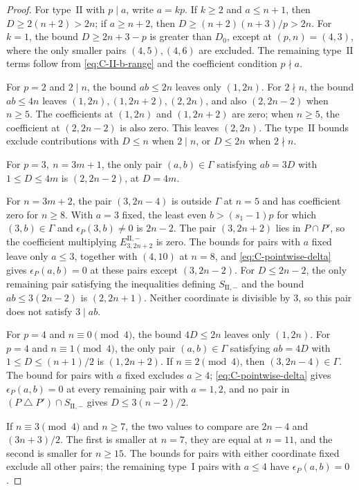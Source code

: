 \documentclass[11pt,a4paper]{amsart}
\theoremstyle{plain}
\numberwithin{equation}{section}
\newenvironment{pf}{\begin{proof}}{\end{proof}}
\begin{document}
\begin{pf}
	For type~\(\mathrm{II}\) with \(p\mid a\), write \(a=kp\).
	If \(k\ge2\) and \(a\le n+1\), then
	\(D\ge2(n+2)>2n\); if \(a\ge n+2\), then
	\(D\ge(n+2)(n+3)/p>2n\). For \(k=1\), the bound
	\(D\ge2n+3-p\) is greater than \(D_0\), except at
	\((p,n)=(4,3)\), where the only smaller pairs \((4,5),(4,6)\)
	are excluded. The remaining type~\(\mathrm{II}\) terms follow from
	\eqref{eq:C-II-b-range} and the coefficient condition \(p\nmid a\).
	
	For \(p=2\) and \(2\mid n\), the bound \(ab\le2n\) leaves only
	\((1,2n)\). For \(2\nmid n\), the bound \(ab\le4n\) leaves
	\((1,2n),(1,2n+2),(2,2n)\), and also \((2,2n-2)\) when
	\(n\ge5\). The coefficients at \((1,2n)\) and \((1,2n+2)\)
	are zero; when \(n\ge5\), the coefficient at \((2,2n-2)\) is
	also zero. This leaves \((2,2n)\).
	The type~\(\mathrm{II}\) bounds exclude contributions with
	\(D\le n\) when \(2\mid n\), or \(D\le2n\) when \(2\nmid n\).
	
	For \(p=3,\ n=3m+1\), the only pair \((a,b)\in\Gamma\)
	satisfying \(ab=3D\) with \(1\le D\le4m\) is
	\((2,2n-2)\), at \(D=4m\).
	
	For \(n=3m+2\), the pair \((3,2n-4)\) is outside \(\Gamma\) at
	\(n=5\) and has coefficient zero for \(n\ge8\).
	With \(a=3\) fixed, the least even \(b>(s_1-1)p\) for which
	\((3,b)\in\Gamma\) and \(\epsilon_P(3,b)\ne0\) is \(2n-2\).
	The pair \((3,2n+2)\) lies in \(P\cap P'\), so the coefficient
	multiplying \(E_{3,2n+2}^{\mathrm{II},-}\) is zero.
	The bounds for pairs with \(a\) fixed leave only \(a\le3\), together with
	\((4,10)\) at \(n=8\), and \eqref{eq:C-pointwise-delta} gives
	\(\epsilon_P(a,b)=0\) at these pairs except \((3,2n-2)\). For \(D\le2n-2\), the only remaining pair satisfying the
	inequalities defining \(S_{\mathrm{II},-}\) and the bound
	\(ab\le3(2n-2)\) is \((2,2n+1)\). Neither coordinate is
	divisible by \(3\), so this pair does not satisfy \(3\mid ab\).
	
	For \(p=4\) and \(n\equiv0\pmod4\), the bound \(4D\le2n\) leaves only
	\((1,2n)\). For \(p=4\) and \(n\equiv1\pmod4\), the only pair
	\((a,b)\in\Gamma\) satisfying \(ab=4D\) with
	\(1\le D\le(n+1)/2\) is \((1,2n+2)\).
	If \(n\equiv2\pmod4\), then \((3,2n-4)\in\Gamma\).
	The bound for pairs with \(a\) fixed excludes \(a\ge4\);
	\eqref{eq:C-pointwise-delta} gives \(\epsilon_P(a,b)=0\) at every
	remaining pair with \(a=1,2\), and no pair in
	\((P\mathbin\triangle P')\cap S_{\mathrm{II},-}\) gives
	\(D\le3(n-2)/2\).
	
	If \(n\equiv3\pmod4\) and \(n\ge7\), the two values to compare
	are \(2n-4\) and \((3n+3)/2\).
	The first is smaller at \(n=7\),
	they are equal at \(n=11\), and the second is smaller for \(n\ge15\).
	The bounds for pairs with either coordinate fixed exclude all other
	pairs; the remaining
	type~\(\mathrm I\) pairs with \(a\le4\) have \(\epsilon_P(a,b)=0\).
	

\end{pf}
\end{document}
